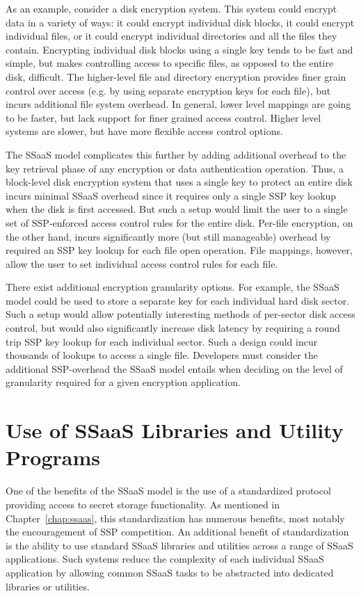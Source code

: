 As an example, consider a disk encryption system. This system could
encrypt data in a variety of ways: it could encrypt individual disk
blocks, it could encrypt individual files, or it could encrypt
individual directories and all the files they contain. Encrypting
individual disk blocks using a single key tends to be fast and simple,
but makes controlling access to specific files, as opposed to the
entire disk, difficult. The higher-level file and directory encryption
provides finer grain control over access (e.g. by using separate
encryption keys for each file), but incurs additional file system
overhead. In general, lower level mappings are going to be faster, but
lack support for finer grained access control. Higher level systems
are slower, but have more flexible access control options.

The SSaaS model complicates this further by adding additional overhead
to the key retrieval phase of any encryption or data authentication
operation. Thus, a block-level disk encryption system that uses a
single key to protect an entire disk incurs minimal SSaaS overhead
since it requires only a single SSP key lookup when the disk is first
accessed. But such a setup would limit the user to a single set of
SSP-enforced access control rules for the entire disk. Per-file
encryption, on the other hand, incurs significantly more (but still
manageable) overhead by required an SSP key lookup for each file open
operation. File mappings, however, allow the user to set individual
access control rules for each file.

There exist additional encryption granularity options. For example,
the SSaaS model could be used to store a separate key for each
individual hard disk sector. Such a setup would allow potentially
interesting methods of per-sector disk access control, but would also
significantly increase disk latency by requiring a round trip SSP key
lookup for each individual sector. Such a design could incur thousands
of lookups to access a single file. Developers must consider the
additional SSP-overhead the SSaaS model entails when deciding on the
level of granularity required for a given encryption application.

\section{Use of SSaaS Libraries and Utility Programs}

One of the benefits of the SSaaS model is the use of a standardized
protocol providing access to secret storage functionality. As
mentioned in Chapter~\ref{chap:ssaas}, this standardization has
numerous benefits, most notably the encouragement of SSP
competition. An additional benefit of standardization is the ability
to use standard SSaaS libraries and utilities across a range of SSaaS
applications. Such systems reduce the complexity of each individual
SSaaS application by allowing common SSaaS tasks to be abstracted into
dedicated libraries or utilities.

